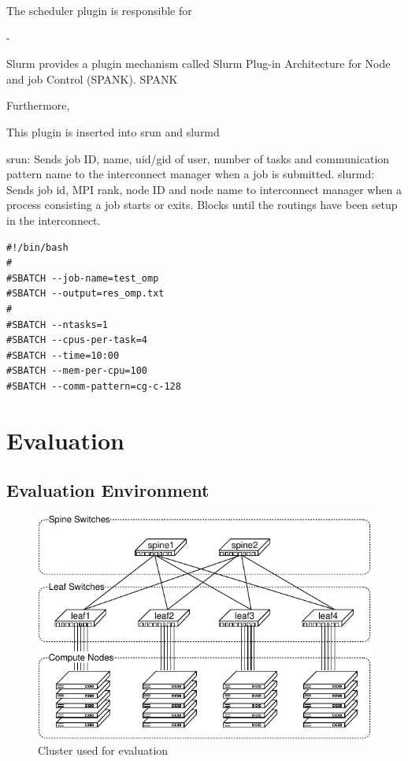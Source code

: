 \documentclass[graybox]{svmult}
\begin{document}
The scheduler plugin is responsible for

-

Slurm provides a plugin mechanism called Slurm Plug-in Architecture for Node
and job Control (SPANK). SPANK

Furthermore,

This plugin is inserted into srun and slurmd

srun: Sends job ID, name, uid/gid of user, number of tasks and communication
pattern name to the interconnect manager when a job is submitted.
slurmd: Sends job id, MPI rank, node ID and node name to interconnect manager
when a process consisting a job starts or exits. Blocks until the routings
have been setup in the interconnect.

\begin{lstlisting}
#!/bin/bash
#
#SBATCH --job-name=test_omp
#SBATCH --output=res_omp.txt
#
#SBATCH --ntasks=1
#SBATCH --cpus-per-task=4
#SBATCH --time=10:00
#SBATCH --mem-per-cpu=100
#SBATCH --comm-pattern=cg-c-128
\end{lstlisting}


\section{Evaluation}

\subsection{Evaluation Environment}

\begin{figure}
    \centering
    \includegraphics{evaluation_cluster}
    \caption{Cluster used for evaluation}%
    \label{kt:fig:cluster}
\end{figure}
\end{document}
